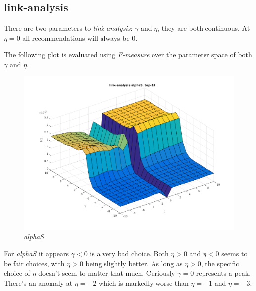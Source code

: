 
\subsection{link-analysis}\label{sec:param:link}

There are two parameters to \textit{link-analysis}: $\gamma$ and $\eta$, they are both continuous. At $\eta = 0$ all recommendations will always be 0.

The following plot is evaluated using \textit{F-measure}  over the parameter space of both $\gamma$ and $\eta$.

\begin{figure}[h!]
    \includegraphics[width=\textwidth]{fig/link_eta_gamma/alphaS_link.png}
    \caption{\textit{alphaS}}
    \label{fig:linkalphaS}
\end{figure}

For \textit{alphaS} it appears $\gamma < 0$ is a very bad choice. Both $\eta > 0$ and $\eta < 0$ seems to be fair choices, with $\eta > 0$ being slightly better. As long as $\eta > 0$, the specific choice of $\eta$ doesn't seem to matter that much. Curiously $\gamma = 0$ represents a peak. There's an anomaly at $\eta = -2$ which is markedly worse than $\eta = -1$ and $\eta = -3$.

\FloatBarrier

